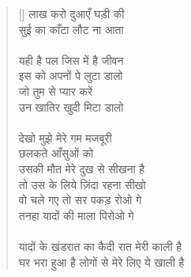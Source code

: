 \begin{verse}[\versewidth]
{लाख करो दुआएँ घड़ी की\\
सुई का काँटा लौट ना आता\\
\\
यही है पल जिस में है जीवन\\
इस को अपनों पे लुटा डालो\\
जो तुम से प्यार करें\\
उन खातिर खुदी मिटा डालो\\
\\
देखो मुझे मेरे गम मजबूरी\\
छलकते आँसुओं को\\
उसकी मौत मेरे दुख से सीखना है\\
तो उस के लिये ज़िंदा रहना सीखो\\
वो चले गए तो सर पकड़ रोओ गे\\
तनहा यादों की माला पिरोओ गे\\
\\
यादों के खंडरात का कैदी रात मेरी काली है\\
घर भरा हुआ है लोगों से मेरे लिए ये खाली है
}\end{verse}

